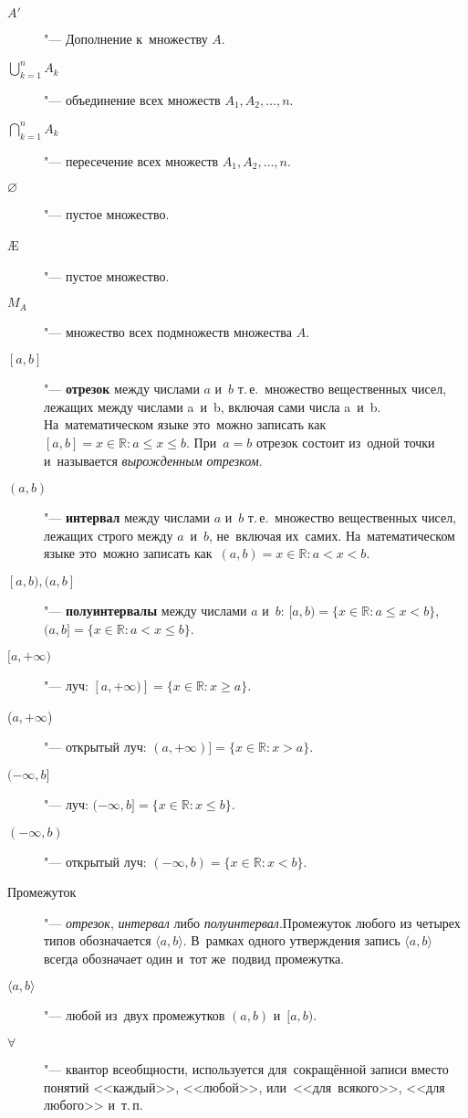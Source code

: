 \documentclass[]{scrartcl}
\begin{document}
\begin{description}
	\item[$A'$] "--- Дополнение к~множеству $A$.
	\item[$\bigcup \limits_{k=1}^{n}A_k$] "--- объединение всех множеств $A_1, A_2,\ldots, n$.
	\item[$\bigcap \limits_{k=1}^{n}A_k$] "--- пересечение всех множеств $A_1, A_2,\ldots, n$.
	\item[$\varnothing$] "--- пустое множество.
	\item[\AE{}] "--- пустое множество.
	\item[$M_A$] "--- множество всех подмножеств множества $A$.
	\item[{$\left[ a,b \right]$}] "--- \textbf{отрезок} между числами $a$ и~$b$ т.\,е.~множество вещественных чисел, лежащих между числами a~и~b, включая сами числа a~и~b. На~математическом языке это~можно записать как~$[a, b] = {x \in \mathbb{R}: a \leq x \leq b }$. При~$a=b$ отрезок состоит из~одной точки и~называется \emph{вырожденным отрезком}.
	\item[$(a, b)$] "--- \textbf{интервал} между числами $a$ и~$b$ т.\,е.~множество вещественных чисел, лежащих строго между $a$~и~$b$, не~включая их~самих. На~математическом языке это~можно записать как~$(a, b) = {x \in \mathbb{R}: a < x < b }$.
	\item[{$\left[ a, b), (a, b\right] $}] "--- \textbf{полуинтервалы} между числами $a$ и~$b$: $[a,b) = \{x \in \mathbb{R}: a \leq x < b\}$, $(a,b] = \{x \in \mathbb{R}: a < x \leq b\}$.
	\item[$[a, +\infty)$] "--- луч: $[a, +\infty)] = \{x \in \mathbb{R}: x \geq a\}$.
	\item[($a, +\infty$)] "--- открытый луч: $(a, +\infty)] = \{x \in \mathbb{R}: x > a \}$.
	\item[{$(-\infty, b]$}] "--- луч: $(- \infty, b] = \{x \in \mathbb{R}: x \leq b\}$.
	\item[$(-\infty, b)$] "--- открытый луч: $(-\infty, b) = \{x \in \mathbb{R}: x < b\}$.
	\item[Промежуток] "--- \emph{отрезок}, \emph{интервал} либо \emph{полуинтервал}.Промежуток любого из четырех типов обозначается $\langle a, b \rangle$. В~рамках одного утверждения запись $\langle a, b \rangle$ всегда обозначает один и~тот же~подвид промежутка.
	\item[$\langle a, b \rangle$] "--- любой из~двух промежутков  $(a,b)$ и~$[a,b)$.
	\item[$\forall$] "--- квантор всеобщности, используется для~сокращённой записи вместо понятий <<каждый>>, <<любой>>, или~<<для~всякого>>, <<для любого>> и~т.\,п.

\end{description}
\end{document}

